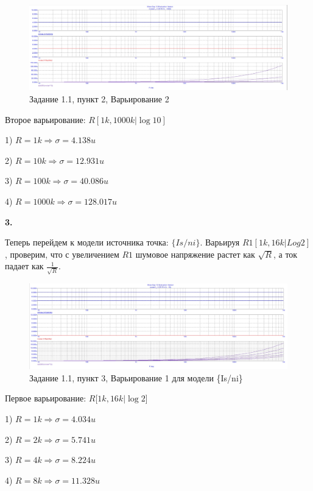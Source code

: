 \documentclass[a4paper, 14pt]{extarticle}%
\begin{document}
\begin{figure}[h!]
	\centering
			\includegraphics[width=1.1\linewidth]{pic2.jpg}
			\caption{Задание 1.1, пункт 2, Варьирование 2}
	\label{A}
\end{figure}

Второе варьирование: $R[1k, 1000k | \log10]$

1) $R = 1k \Rightarrow \sigma = 4.138u$

2) $R = 10k \Rightarrow \sigma = 12.931u$

3) $R = 100k \Rightarrow \sigma = 40.086u$

4) $R = 1000k \Rightarrow \sigma = 128.017u$


\textbf{3.}

Теперь перейдем к модели источника точка: $\{Is/ni\}$. Варьируя $R1[1k, 16k | Log2]$, проверим, что с увеличением $R1$ шумовое напряжение растет как $\sqrt{R}$, а ток падает как $\frac{1}{\sqrt{R}}$.

\begin{figure}[h!]
			\centering
			\includegraphics[width=1.1\linewidth]{pic3.jpg}
			\caption{Задание 1.1, пункт 3, Варьирование 1 для модели \{Is/ni\}}
			\label{A}
\end{figure}


Первое варьирование: $R[1k, 16k | \log2$]

1) $R = 1k \Rightarrow \sigma = 4.034u$

2) $R = 2k \Rightarrow \sigma = 5.741u$

3) $R = 4k \Rightarrow \sigma = 8.224u$

4) $R = 8k \Rightarrow \sigma = 11.328u$
\end{document}
